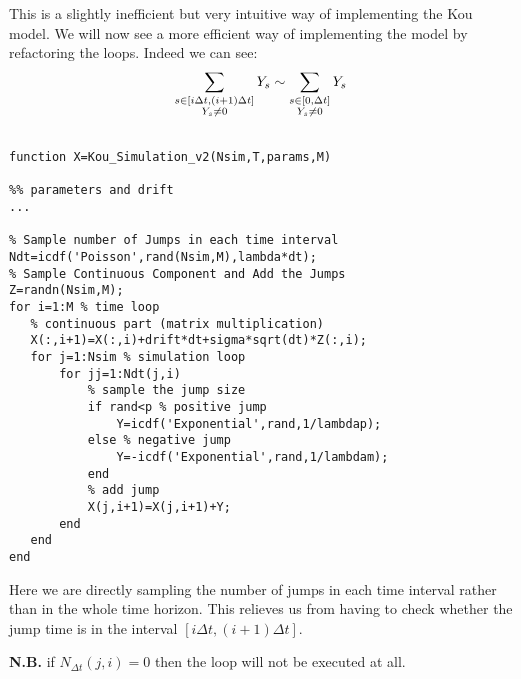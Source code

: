 This is a slightly inefficient but very intuitive way of implementing the Kou
model. We will now see a more efficient way of implementing the model by 
refactoring the loops.
Indeed we can see:
\[ \sum_{\begin{subarray}{c} s\in[i\Delta t, (i+1)\Delta t] \\ Y_s \neq 0
\end{subarray}} Y_s \sim \sum_{\begin{subarray}{c} s\in[0, \Delta t] \\ Y_s \neq
0 \end{subarray}} Y_s \]

\begin{verbatim}

function X=Kou_Simulation_v2(Nsim,T,params,M)

%% parameters and drift
...

% Sample number of Jumps in each time interval
Ndt=icdf('Poisson',rand(Nsim,M),lambda*dt);
% Sample Continuous Component and Add the Jumps
Z=randn(Nsim,M);
for i=1:M % time loop
   % continuous part (matrix multiplication)
   X(:,i+1)=X(:,i)+drift*dt+sigma*sqrt(dt)*Z(:,i);
   for j=1:Nsim % simulation loop
       for jj=1:Ndt(j,i)
           % sample the jump size
           if rand<p % positive jump
               Y=icdf('Exponential',rand,1/lambdap);
           else % negative jump
               Y=-icdf('Exponential',rand,1/lambdam);
           end
           % add jump
           X(j,i+1)=X(j,i+1)+Y;
       end
   end
end
\end{verbatim}

Here we are directly sampling the number of jumps in each time interval rather
than in the whole time horizon. This relieves us from having to check whether
the jump time is in the interval $[i\Delta t, (i+1)\Delta t]$.

\textbf{N.B.} if $N_{\Delta t}(j,i) = 0$ then the loop will not be executed at
all.
